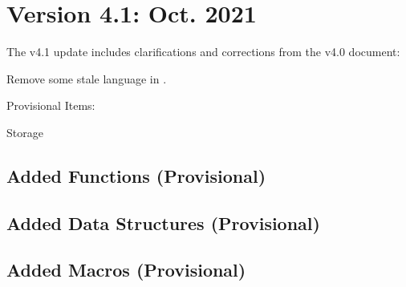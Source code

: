 \section{Version 4.1: Oct. 2021}

The v4.1 update includes clarifications and corrections from the v4.0 document:

\begin{compactitemize}
    \item Remove some stale language in .
    \item Provisional Items:
    \begin{compactitemize}
        \item Storage 
    \end{compactitemize}
\end{compactitemize}

\subsection{Added Functions (Provisional)}

\begin{compactitemize}
  \item {}
  \item {}
  \item {}
  \item {}
\end{compactitemize}

\subsection{Added Data Structures (Provisional)}

\begin{compactitemize}
    \item {}
    \item {}
    \item {}
    \item {}
\end{compactitemize}

\subsection{Added Macros (Provisional)}


